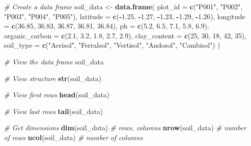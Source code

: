 \documentclass[
  10pt,
  b5paper,
  oneside]{book}
\newenvironment{Shaded}{\begin{snugshade}}{\end{snugshade}}
\newcommand{\AttributeTok}[1]{\textcolor[rgb]{0.13,0.29,0.53}{#1}}
\newcommand{\CommentTok}[1]{\textcolor[rgb]{0.56,0.35,0.01}{\textit{#1}}}
\newcommand{\DecValTok}[1]{\textcolor[rgb]{0.00,0.00,0.81}{#1}}
\newcommand{\FloatTok}[1]{\textcolor[rgb]{0.00,0.00,0.81}{#1}}
\newcommand{\FunctionTok}[1]{\textcolor[rgb]{0.13,0.29,0.53}{\textbf{#1}}}
\newcommand{\NormalTok}[1]{#1}
\newcommand{\OtherTok}[1]{\textcolor[rgb]{0.56,0.35,0.01}{#1}}
\newcommand{\SpecialCharTok}[1]{\textcolor[rgb]{0.81,0.36,0.00}{\textbf{#1}}}
\newcommand{\StringTok}[1]{\textcolor[rgb]{0.31,0.60,0.02}{#1}}
\begin{document}
\begin{Shaded}
\begin{Highlighting}[]
\CommentTok{\# Create a data frame}
\NormalTok{soil\_data }\OtherTok{\textless{}{-}} \FunctionTok{data.frame}\NormalTok{(}
  \AttributeTok{plot\_id =} \FunctionTok{c}\NormalTok{(}\StringTok{"P001"}\NormalTok{, }\StringTok{"P002"}\NormalTok{, }\StringTok{"P003"}\NormalTok{, }\StringTok{"P004"}\NormalTok{, }\StringTok{"P005"}\NormalTok{),}
  \AttributeTok{latitude =} \FunctionTok{c}\NormalTok{(}\SpecialCharTok{{-}}\FloatTok{1.25}\NormalTok{, }\SpecialCharTok{{-}}\FloatTok{1.27}\NormalTok{, }\SpecialCharTok{{-}}\FloatTok{1.23}\NormalTok{, }\SpecialCharTok{{-}}\FloatTok{1.29}\NormalTok{, }\SpecialCharTok{{-}}\FloatTok{1.26}\NormalTok{),}
  \AttributeTok{longitude =} \FunctionTok{c}\NormalTok{(}\FloatTok{36.85}\NormalTok{, }\FloatTok{36.83}\NormalTok{, }\FloatTok{36.87}\NormalTok{, }\FloatTok{36.81}\NormalTok{, }\FloatTok{36.84}\NormalTok{),}
  \AttributeTok{ph =} \FunctionTok{c}\NormalTok{(}\FloatTok{5.2}\NormalTok{, }\FloatTok{6.5}\NormalTok{, }\FloatTok{7.1}\NormalTok{, }\FloatTok{5.8}\NormalTok{, }\FloatTok{6.9}\NormalTok{),}
  \AttributeTok{organic\_carbon =} \FunctionTok{c}\NormalTok{(}\FloatTok{2.1}\NormalTok{, }\FloatTok{3.2}\NormalTok{, }\FloatTok{1.8}\NormalTok{, }\FloatTok{2.7}\NormalTok{, }\FloatTok{2.9}\NormalTok{),}
  \AttributeTok{clay\_content =} \FunctionTok{c}\NormalTok{(}\DecValTok{25}\NormalTok{, }\DecValTok{30}\NormalTok{, }\DecValTok{18}\NormalTok{, }\DecValTok{42}\NormalTok{, }\DecValTok{35}\NormalTok{),}
  \AttributeTok{soil\_type =} \FunctionTok{c}\NormalTok{(}\StringTok{"Acrisol"}\NormalTok{, }\StringTok{"Ferralsol"}\NormalTok{, }\StringTok{"Vertisol"}\NormalTok{, }\StringTok{"Andosol"}\NormalTok{, }\StringTok{"Cambisol"}\NormalTok{)}
\NormalTok{)}

\CommentTok{\# View the data frame}
\NormalTok{soil\_data}

\CommentTok{\# View structure}
\FunctionTok{str}\NormalTok{(soil\_data)}

\CommentTok{\# View first rows}
\FunctionTok{head}\NormalTok{(soil\_data)}

\CommentTok{\# View last rows}
\FunctionTok{tail}\NormalTok{(soil\_data)}

\CommentTok{\# Get dimensions}
\FunctionTok{dim}\NormalTok{(soil\_data)         }\CommentTok{\# rows, columns}
\FunctionTok{nrow}\NormalTok{(soil\_data)        }\CommentTok{\# number of rows}
\FunctionTok{ncol}\NormalTok{(soil\_data)        }\CommentTok{\# number of columns}
\end{Highlighting}
\end{Shaded}
\end{document}
